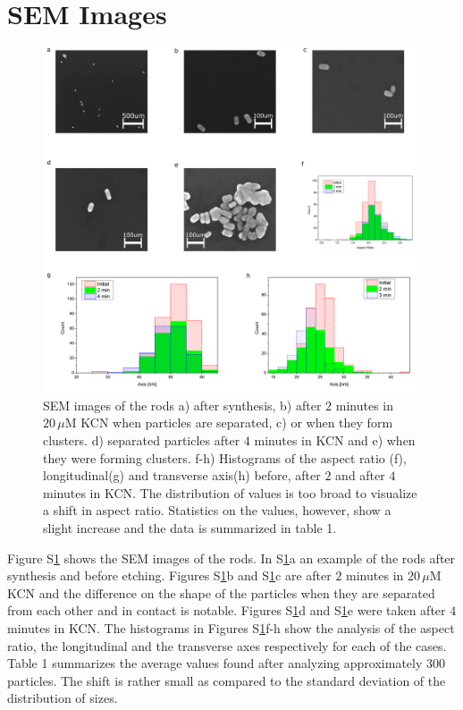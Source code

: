\documentclass[journal=jpccck]{achemso}
\newcommand{\uM}{\ensuremath{\,\mu\textrm{M}}}
\begin{document}
\section{SEM Images}

\begin{figure}[htp]
 \centering
 \includegraphics[width=0.95\linewidth]{Figures/04_Supporting/02_SEM/sem.png}
 \caption{SEM images of the rods a) after synthesis, b) after $2$ minutes in
 $20\uM$ KCN when particles are separated, c) or when they form clusters. d)
 separated particles after $4$ minutes in KCN and e) when they were forming
 clusters. f-h) Histograms of the aspect ratio (f), longitudinal(g) and
 transverse axis(h) before, after $2$ and after $4$ minutes in KCN. The
 distribution of values is too broad to visualize a shift in aspect ratio.
 Statistics on the values, however, show a slight increase and the data is
 summarized in table 1. }
 \label{fig:SEM}
\end{figure}

Figure S\ref{fig:SEM} shows the SEM images of the rods. In S\ref{fig:SEM}a an
example of the rods after synthesis and before etching. Figures S\ref{fig:SEM}b
and S\ref{fig:SEM}c are after $2$ minutes in $20\uM$ KCN and the difference on
the shape of the particles when they are separated from each other and in
contact is notable. Figures S\ref{fig:SEM}d and S\ref{fig:SEM}e were taken after
$4$ minutes in KCN. The histograms in Figures S\ref{fig:SEM}f-h show the
analysis of the aspect ratio, the longitudinal and the transverse axes
respectively for each of the cases. Table 1 summarizes the average values found
after analyzing approximately $300$ particles. The shift is rather small as
compared to the standard deviation of the distribution of sizes.
\end{document}
